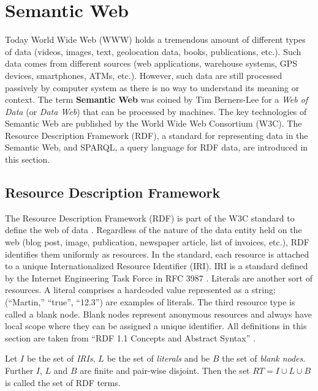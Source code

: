 \section{Semantic Web}
\label{sec:preliminaries:semanticweb}

Today World Wide Web (WWW) holds a tremendous amount of different types of data (videos, images, text, geolocation data, books, publications, etc.). 
Such data comes from different sources (web applications, warehouse systems, GPS devices, smartphones, ATMs, etc.).
However, such data are still processed passively by computer system as there is no way to understand its meaning or context.
The term \textbf{Semantic Web} was coined by Tim Berners-Lee for a \textit{Web of Data} (or \textit{Data Web}) \cite{LeeWeavingTheWeb} that can be processed by machines. 
The key technologies of Semantic Web are published by the World Wide Web Consortium (W3C). 
The Resource Description Framework (RDF), a standard for representing data in the Semantic Web, and SPARQL, a query language for RDF data, are introduced in this section.

\subsection{Resource Description Framework}

The Resource Description Framework (RDF) is part of the W3C standard to define the web of data \cite{rdfonline}. Regardless of the nature of the data entity held on the web (blog post, image, publication, newspaper article,  list of invoices, etc.), RDF identifies them uniformly as resources. In the standard, each resource is attached to a unique Internationalized Resource Identifier (IRI). IRI is a standard defined by the Internet Engineering Task Force in RFC 3987 \cite{Pasd}. Literals are another sort of resources. A literal comprises a hardcoded value represented as a string; (“Martin,” “true”, “12.3”) are examples of literals. The third resource type is called a blank node. Blank nodes represent anonymous resources and always have local scope where they can be assigned a unique identifier. All definitions in this section are taken from “RDF 1.1 Concepts and Abstract Syntax” \cite{asd}. \\

\begin{definition}
Let $I$ be the set of \textit{IRIs}, $L$ be the set of \textit{literals} and be $B$ the set of
\textit{blank nodes}. Further $I$, $L$ and $B$ are finite and pair-wise disjoint. Then the set $RT = I \cup L \cup B$ is called the set of RDF terms. 
\end{definition}

